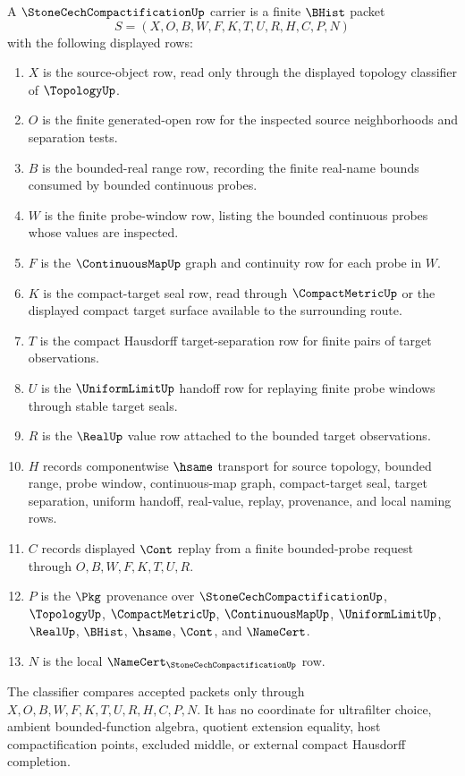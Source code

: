\begin{definition}
\label{def:stone-cech-compactification-finite-probe-carrier}
A $\StoneCechCompactificationUp$ carrier is a finite $\BHist$ packet
$$
S=(X,O,B,W,F,K,T,U,R,H,C,P,N)
$$
with the following displayed rows:
\begin{enumerate}
\item $X$ is the source-object row, read only through the displayed topology classifier of $\TopologyUp$.
\item $O$ is the finite generated-open row for the inspected source neighborhoods and separation tests.
\item $B$ is the bounded-real range row, recording the finite real-name bounds consumed by bounded continuous probes.
\item $W$ is the finite probe-window row, listing the bounded continuous probes whose values are inspected.
\item $F$ is the $\ContinuousMapUp$ graph and continuity row for each probe in $W$.
\item $K$ is the compact-target seal row, read through $\CompactMetricUp$ or the displayed compact target surface available to the surrounding route.
\item $T$ is the compact Hausdorff target-separation row for finite pairs of target observations.
\item $U$ is the $\UniformLimitUp$ handoff row for replaying finite probe windows through stable target seals.
\item $R$ is the $\RealUp$ value row attached to the bounded target observations.
\item $H$ records componentwise $\hsame$ transport for source topology, bounded range, probe window, continuous-map graph, compact-target seal, target separation, uniform handoff, real-value, replay, provenance, and local naming rows.
\item $C$ records displayed $\Cont$ replay from a finite bounded-probe request through $O,B,W,F,K,T,U,R$.
\item $P$ is the $\Pkg$ provenance over $\StoneCechCompactificationUp$, $\TopologyUp$, $\CompactMetricUp$, $\ContinuousMapUp$, $\UniformLimitUp$, $\RealUp$, $\BHist$, $\hsame$, $\Cont$, and $\NameCert$.
\item $N$ is the local $\NameCert_{\StoneCechCompactificationUp}$ row.
\end{enumerate}
The classifier compares accepted packets only through $X,O,B,W,F,K,T,U,R,H,C,P,N$. It has no coordinate for ultrafilter choice, ambient bounded-function algebra, quotient extension equality, host compactification points, excluded middle, or external compact Hausdorff completion.
\end{definition}

